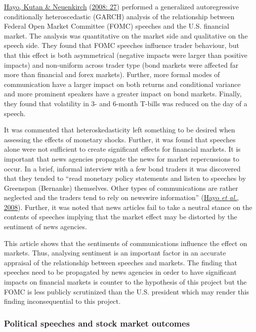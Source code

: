 \documentclass[11pt,preprint, authoryear]{elsarticle}
\numberwithin{equation}{section}
\numberwithin{figure}{section}
\numberwithin{table}{section}
\begin{document}
\protect\hyperlink{ref-hayo2008communicating}{Hayo, Kutan \& Neuenkirch}
(\protect\hyperlink{ref-hayo2008communicating}{2008: 27}) performed a
generalized autoregressive conditionally heteroscedastic (GARCH)
analysis of the relationship between Federal Open Market Committee
(FOMC) speeches and the U.S. financial market. The analysis was
quantitative on the market side and qualitative on the speech side. They
found that FOMC speeches influence trader behaviour, but that this
effect is both asymmetrical (negative impacts were larger than positive
impacts) and non-uniform across trader type (bond markets were affected
far more than financial and forex markets). Further, more formal modes
of communication have a larger impact on both returns and conditional
variance and more prominent speakers have a greater impact on bond
markets. Finally, they found that volatility in 3- and 6-month T-bills
was reduced on the day of a speech.

It was commented that heteroskedasticity left something to be desired
when assessing the effects of monetary shocks. Further, it was found
that speeches alone were not sufficient to create significant effects
for financial markets. It is important that news agencies propagate the
news for market repercussions to occur. In a brief, informal interview
with a few bond traders it was discovered that they tended to ``read
monetary policy statements and listen to speeches by Greenspan
(Bernanke) themselves. Other types of communications are rather
neglected and the traders tend to rely on newswire information''
(\protect\hyperlink{ref-hayo2008communicating}{Hayo \emph{et al.},
2008}). Further, it was noted that news articles fail to take a neutral
stance on the contents of speeches implying that the market effect may
be distorted by the sentiment of news agencies.

This article shows that the sentiments of communications influence the
effect on markets. Thus, analysing sentiment is an important factor in
an accurate appraisal of the relationship between speeches and markets.
The finding that speeches need to be propagated by news agencies in
order to have significant impacts on financial markets is counter to the
hypothesis of this project but the FOMC is less publicly scrutinized
than the U.S. president which may render this finding inconsequential to
this project.

\hypertarget{political-speeches-and-stock-market-outcomes}{%
\subsubsection{Political speeches and stock market
outcomes}\label{political-speeches-and-stock-market-outcomes}}
\end{document}
